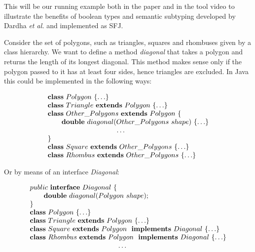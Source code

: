 \documentclass[runningheads]{llncs}
\begin{document}
\begin{example}[Polygons]
    \label{polygons}
    This will be our running example both in the paper and in the tool video \cite{UD20} to illustrate the benefits of boolean types and semantic subtyping developed by Dardha \emph{et al.} \cite{Dardha2013,Dardha2017} and implemented as SFJ.

    Consider the set of polygons, such as triangles, squares and rhombuses given by a class hierarchy.
    We want to define a method \emph{diagonal} that takes a polygon and returns the length of its longest diagonal.
    This method makes sense only if the polygon passed to it has at least four sides, hence triangles are excluded.
    In Java this could be implemented in the following ways:

    \begin{equation*}
        \begin{array}{l}
            \synclass Polygon \ \{ \ldots\}
            \\
            \syndecl{Triangle}{Polygon} {\ldots}
            \\
            \syndecl{Other\_Polygons}{Polygon} {
                \\
                \qquad \mathbf{double}\ diagonal(Other\_Polygons \ shape)\ \{\ldots \}
                \\
                \hspace{3.5cm} \ldots
                \\
            }
            \\
            \syndecl{Square}{Other\_Polygons}{\ldots}
            \\
            \syndecl{Rhombus}{Other\_Polygons} {\ldots}
        \end{array}
    \end{equation*}

    Or by means of an interface \emph{Diagonal}:

    \begin{equation*}
        \begin{array}{l}
            public \ \syninterface Diagonal\ \{
            \\
            \qquad \mathbf{double}\ diagonal(Polygon \ shape);
            \\
            \}
            \\
            \synclass Polygon \ \{\ldots\}
            \\
            \syndecl{Triangle}{Polygon} {\ldots}
            \\
            \synidecl{Square}{Polygon} \synimpl Diagonal \ \{\ldots\}
            \\
            \synidecl{Rhombus}{Polygon} \synimpl Diagonal \ \{\ldots\}
            \\
            \hspace{4.5cm} \ldots
        \end{array}
    \end{equation*}


\end{example}
\end{document}
